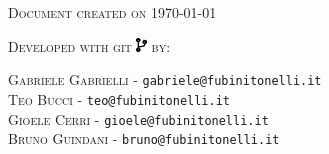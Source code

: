 




\textsc{Document created on \today}

\textsc{Developed with git \includegraphics[height=1em]{images/code} by:}

\textsc{Gabriele Gabrielli} - \texttt{gabriele@fubinitonelli.it}\\
\textsc{Teo Bucci} - \texttt{teo@fubinitonelli.it}\\
\textsc{Gioele Cerri} - \texttt{gioele@fubinitonelli.it}\\
\textsc{Bruno Guindani} - \texttt{bruno@fubinitonelli.it}

